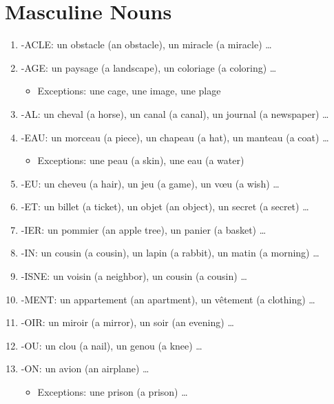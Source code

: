\documentclass{book}
\begin{document}
    \section{Masculine Nouns}
        \begin{enumerate}
            \item -ACLE: un obstacle (an obstacle), un miracle (a miracle) \dots
            \item -AGE: un paysage (a landscape), un coloriage (a coloring) \dots
            \begin{itemize}
                \item Exceptions: une cage, une image, une plage
            \end{itemize}
            \item -AL: un cheval (a horse), un canal (a canal), un journal (a newspaper) \dots
            \item -EAU: un morceau (a piece), un chapeau (a hat), un manteau (a coat) \dots
            \begin{itemize}
                \item Exceptions: une peau (a skin), une eau (a water)
            \end{itemize}
            \item -EU: un cheveu (a hair), un jeu (a game), un vœu (a wish) \dots
            \item -ET: un billet (a ticket), un objet (an object), un secret (a secret) \dots
            \item -IER: un pommier (an apple tree), un panier (a basket) \dots
            \item -IN: un cousin (a cousin), un lapin (a rabbit), un matin (a morning) \dots
            \item -ISNE: un voisin (a neighbor), un cousin (a cousin) \dots
            \item -MENT: un appartement (an apartment), un vêtement (a clothing) \dots
            \item -OIR: un miroir (a mirror), un soir (an evening) \dots
            \item -OU: un clou (a nail), un genou (a knee) \dots
            \item -ON: un avion (an airplane) \dots
            \begin{itemize}
                \item Exceptions: une prison (a prison) \dots
            \end{itemize}
        \end{enumerate}
    
\end{document}
